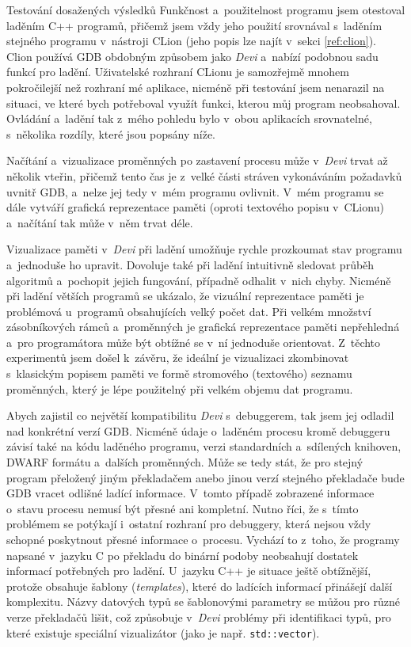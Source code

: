 \documentclass[czech,bachelor,male,python,dept460,hidelinks]{diploma}						%
\newcommand{\parspace}[1][]{
	\ifthenelse{\isempty{#1}}{\vspace{0mm}}{\vspace{#1}}
	\par
}
\begin{document}
\begin{section}{Testování dosažených výsledků}
	Funkčnost a~použitelnost programu jsem otestoval laděním C++ programů, přičemž jsem vždy jeho použití srovnával s~laděním stejného programu v~nástroji
	CLion (jeho popis lze najít v~sekci \ref{ref:clion}). Clion používá GDB obdobným způsobem jako \textit{Devi} a~nabízí podobnou sadu funkcí pro ladění.
	Uživatelské rozhraní CLionu je samozřejmě mnohem pokročilejší než rozhraní mé aplikace, nicméně při testování jsem nenarazil na situaci,
	ve které bych potřeboval využít funkci, kterou můj program neobsahoval. Ovládání a~ladění tak z~mého pohledu bylo v~obou aplikacích srovnatelné,
	s~několika rozdíly, které jsou popsány níže.

	\parspace Načítání a~vizualizace proměnných po zastavení procesu může v~\textit{Devi} trvat až několik vteřin, přičemž tento čas je z~velké části stráven
	vykonáváním požadavků uvnitř GDB, a~nelze jej tedy v~mém programu ovlivnit. V~mém programu se dále vytváří grafická reprezentace paměti
	(oproti textového popisu v~CLionu) a~načítání tak může v~něm trvat déle.

	\parspace Vizualizace paměti v~\textit{Devi} při ladění umožňuje rychle prozkoumat stav programu a~jednoduše ho upravit.
	Dovoluje také při ladění intuitivně sledovat průběh algoritmů a~pochopit jejich fungování, případně odhalit v~nich chyby.
	Nicméně při ladění větších programů se ukázalo, že vizuální reprezentace paměti je problémová u~programů obsahujících velký počet dat.
	Při velkém množství zásobníkových rámců a~proměnných je grafická reprezentace paměti nepřehledná a~pro programátora může být obtížné se v~ní
	jednoduše orientovat. Z~těchto experimentů jsem došel k~závěru, že ideální je vizualizaci zkombinovat s~klasickým popisem paměti ve formě stromového
	(textového) seznamu proměnných, který je lépe použitelný při velkém objemu dat programu.
	
	\parspace Abych zajistil co největší kompatibilitu \textit{Devi} s~debuggerem, tak jsem jej odladil nad konkrétní verzí GDB. Nicméně údaje o~laděném procesu kromě
	debuggeru závisí také na kódu laděného programu, verzi standardních a~sdílených knihoven, DWARF formátu a~dalších proměnných.
	Může se tedy stát, že pro stejný program přeložený jiným překladačem anebo jinou verzí stejného překladače bude GDB vracet odlišné ladící informace.
	V~tomto případě zobrazené informace o~stavu procesu nemusí být přesné ani kompletní. Nutno říci, že s~tímto problémem
	se potýkají i~ostatní rozhraní pro debuggery, která nejsou vždy schopné poskytnout přesné informace o~procesu. Vychází to z~toho, že programy napsané v~jazyku C
	po překladu do binární podoby neobsahují dostatek informací potřebných pro ladění. U~jazyku C++ je situace ještě obtížnější, protože obsahuje šablony
	(\textit{templates}), které do ladících informací přinášejí další komplexitu. Názvy datových typů se šablonovými parametry se můžou pro
	různé verze překladačů lišit, což způsobuje v~\textit{Devi} problémy při identifikaci typů, pro které existuje speciální vizualizátor
	(jako je např. \texttt{std::vector}).
	

\end{section}
\end{document}
